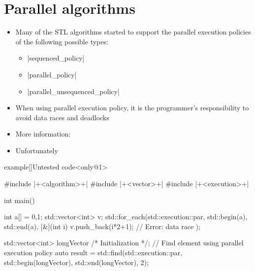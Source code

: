 \section{Parallel algorithms}
\begin{frame}[fragile]{\insertsectionhead}
    \vspace{-3mm}
    \begin{itemize}
        \item Many of the STL algorithms started to support the parallel execution policies of the following possible types:
              \begin{itemize}
                  \item \CPP|sequenced_policy|
                  \item \CPP|parallel_policy|
                  \item \CPP|parallel_unsequenced_policy|
              \end{itemize}
        \item \alert{When using parallel execution policy, it is the programmer's responsibility to avoid data races and deadlocks}
        \item More information: 
        \item Unfortunately  
    \end{itemize}
\end{frame}
\begin{frame}[fragile]{}
    \begin{varblock}{example}[\textwidth]{Untested code}<only@1>
        \begin{Cpp}
            #include |+<algorithm>+|
            #include |+<vector>+|
            #include |+<execution>+|

            int main()
            {
                int a[] = {0,1};
                std::vector<int> v;
                std::for_each(std::execution::par,
                              std::begin(a), std::end(a),
                              [&](int i){
                                  v.push_back(i*2+1); // Error: data race
                              });

                std::vector<int> longVector /* Initialization */;
                // Find element using parallel execution policy
                auto result = std::find(std::execution::par,
                                        std::begin(longVector),
                                        std::end(longVector),
                                        2);
            }
        \end{Cpp}
    \end{varblock}
\end{frame}


